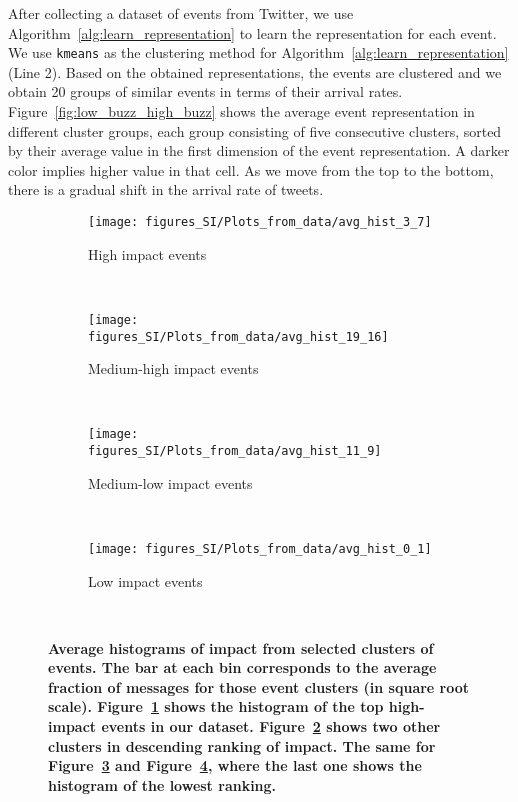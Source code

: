 After collecting a dataset of events from Twitter, we use
Algorithm~\ref{alg:learn_representation} to learn the representation
for each event. We use \texttt{kmeans} as the clustering method for
Algorithm~\ref{alg:learn_representation} (Line 2). Based on the
obtained representations, the events are clustered and we obtain 20
groups of similar events in terms of their arrival rates.
Figure~\ref{fig:low_buzz_high_buzz} shows the average event
representation in different cluster groups, each group consisting of
five consecutive clusters, sorted by their average value in the first
dimension of the event representation. A darker color implies higher
value in that cell. As we move from the top to the bottom, there is a
gradual shift in the arrival rate of tweets.

\begin{figure}
  \centering
  \begin{subfigure}[b]{0.5\textwidth}
    \texttt{[image: figures\_SI/Plots\_from\_data/avg\_hist\_3\_7]}
    \caption{High impact events}
    \label{fig:highest}
  \end{subfigure}%
  ~
  \begin{subfigure}[b]{0.5\textwidth}
    \texttt{[image: figures\_SI/Plots\_from\_data/avg\_hist\_19\_16]}
    \caption{Medium-high impact events}
    \label{fig:high}
  \end{subfigure}%
  ~

  \begin{subfigure}[b]{0.5\textwidth}
    \texttt{[image: figures\_SI/Plots\_from\_data/avg\_hist\_11\_9]}
    \caption{Medium-low impact events}
    \label{fig:med}
  \end{subfigure}%
  ~
  \begin{subfigure}[b]{0.5\textwidth}
    \texttt{[image: figures\_SI/Plots\_from\_data/avg\_hist\_0\_1]}
    \caption{Low impact events}
    \label{fig:low}
  \end{subfigure}%
  ~
  \caption{\textbf{Average histograms of impact from selected clusters
      of events. The bar at each bin corresponds to the average
      fraction of messages for those event clusters (in square root
      scale). Figure~\ref{fig:highest} shows the histogram of the top
      high-impact events in our dataset. Figure~\ref{fig:high} shows
      two other clusters in descending ranking of impact. The same for
      Figure~\ref{fig:med} and Figure~\ref{fig:low}, where the last
      one shows the histogram of the lowest
      ranking.}}\label{fig:histograms}
\end{figure}

